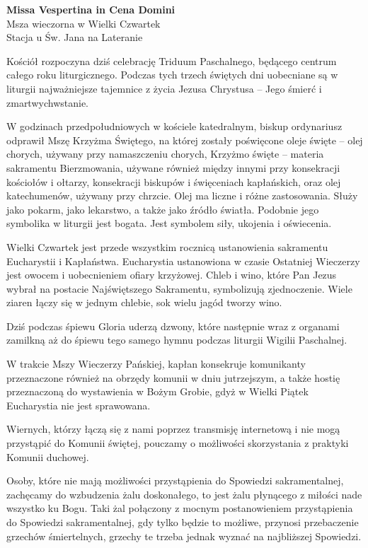 \documentclass[10pt,oneside,final,notitlepage,a4paper,wide]{mwart}
\begin{document}
%
\begin{center}
	\LARGE{\textbf{Missa Vespertina in Cena Domini}}\\ \smallskip
	\small{Msza wieczorna w Wielki Czwartek\\ \smallskip Stacja u Św. Jana na Lateranie}
\end{center} \vspace{1cm}

	Kościół rozpoczyna dziś celebrację Triduum Paschalnego, będącego centrum całego roku liturgicznego. Podczas tych trzech świętych dni uobecniane są w liturgii najważniejsze tajemnice z życia Jezusa Chrystusa -- Jego śmierć i zmartwychwstanie.

W godzinach przedpołudniowych w kościele katedralnym, biskup ordynariusz odprawił Mszę Krzyżma Świętego, na której zostały poświęcone oleje święte -- olej chorych, używany przy namaszczeniu chorych, Krzyżmo święte -- materia sakramentu Bierzmowania, używane również między innymi przy konsekracji kościołów i ołtarzy, konsekracji biskupów i święceniach kapłańskich, oraz olej katechumenów, używany przy chrzcie. Olej ma liczne i różne zastosowania. Służy jako pokarm, jako lekarstwo, a także jako źródło światła. Podobnie jego symbolika w liturgii jest bogata. Jest symbolem siły, ukojenia i oświecenia.

Wielki Czwartek jest przede wszystkim rocznicą ustanowienia sakramentu Eucharystii i Kapłaństwa. Eucharystia ustanowiona w czasie Ostatniej Wieczerzy jest owocem i uobecnieniem ofiary krzyżowej. Chleb i wino, które Pan Jezus wybrał na postacie Najświętszego Sakramentu, symbolizują zjednoczenie. Wiele ziaren łączy się w jednym chlebie, sok wielu jagód tworzy wino.

Dziś podczas śpiewu Gloria uderzą dzwony, które następnie wraz z organami zamilkną aż do śpiewu tego samego hymnu podczas liturgii Wigilii Paschalnej.

W trakcie Mszy Wieczerzy Pańskiej, kapłan konsekruje komunikanty przeznaczone również na obrzędy komunii w dniu jutrzejszym, a także hostię przeznaczoną do wystawienia w Bożym Grobie, gdyż w Wielki Piątek Eucharystia nie jest sprawowana.

Wiernych, którzy łączą się z nami poprzez transmisję internetową i nie mogą przystąpić do Komunii świętej, pouczamy o możliwości skorzystania z praktyki Komunii duchowej.

Osoby, które nie mają możliwości przystąpienia do Spowiedzi sakramentalnej, zachęcamy do wzbudzenia żalu doskonałego, to jest żalu płynącego z miłości nade wszystko ku Bogu. Taki żal połączony z mocnym postanowieniem przystąpienia do Spowiedzi sakramentalnej, gdy tylko będzie to możliwe, przynosi przebaczenie grzechów śmiertelnych, grzechy te trzeba jednak wyznać na najbliższej Spowiedzi.
\end{document}
